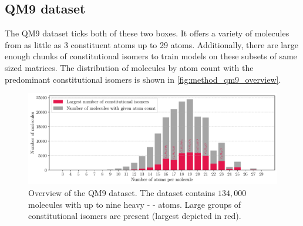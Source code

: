 \subsection{QM9 dataset \parencite{ref:data_qm9}}
\label{subsec:qm9}
The QM9 dataset \parencite{ref:article1_qm9,ref:article2_qm9} ticks both of these two boxes. It offers a variety of molecules from as little as 3 constituent atoms up to 29 atoms. Additionally, there are large enough chunks of constitutional isomers to train models on these subsets of same sized matrices. The distribution of molecules by atom count with the predominant constitutional isomers is shown in \autoref{fig:method_qm9_overview}.
\begin{figure}[H]
    \centering
    \includegraphics[width=\textwidth]{../fig/qm9_general/qm9_overview_stacked_bar.pdf}
    \caption[QM9 dataset overview]{Overview of the QM9 dataset. The dataset contains $134,000$ molecules with up to nine heavy -     - atoms. Large groups of constitutional isomers are present (largest depicted in red).}
    \label{fig:method_qm9_overview}
\end{figure}
